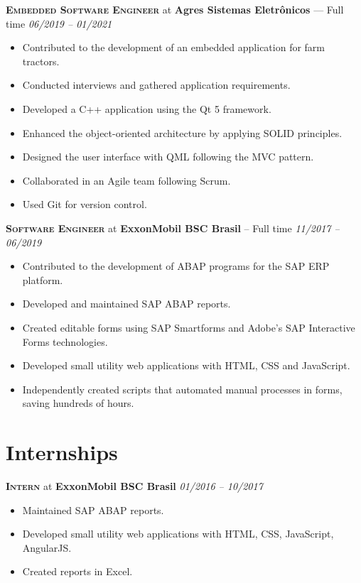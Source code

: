 \documentclass[a4paper,12pt]{article}
\begin{document}
\textbf{\textsc{Embedded Software Engineer}} at \textbf{Agres Sistemas Eletrônicos} --- Full time \hfill \textit{06/2019 -- 01/2021}

{\small
\begin{itemize}[leftmargin=*,label=\large\textbullet]
    \setlength\itemsep{-0.2em}
    \item Contributed to the development of an embedded application for farm tractors.
    \item Conducted interviews and gathered application requirements.
    \item Developed a C++ application using the Qt 5 framework.
    \item Enhanced the object-oriented architecture by applying SOLID principles.
    \item Designed the user interface with QML following the MVC pattern.
    \item Collaborated in an Agile team following Scrum.
    \item Used Git for version control.
\end{itemize}
}

\textbf{\textsc{Software Engineer}} at \textbf{ExxonMobil BSC Brasil} -- Full time \hfill \textit{11/2017 -- 06/2019}
{\small
\begin{itemize}[leftmargin=*,label=\large\textbullet]
    \setlength\itemsep{-0.2em}
    \item Contributed to the development of ABAP programs for the SAP ERP platform.
    \item Developed and maintained SAP ABAP reports.
    \item Created editable forms using SAP Smartforms and Adobe's SAP Interactive Forms technologies.
    \item Developed small utility web applications with HTML, CSS and JavaScript.
    \item Independently created scripts that automated manual processes in forms, saving hundreds of hours.
\end{itemize}
}

\section{Internships}
\vspace{8pt}

\textbf{\textsc{Intern}} at \textbf{ExxonMobil BSC Brasil} \hfill \textit{01/2016 -- 10/2017}
{\small
\begin{itemize}[leftmargin=*,label=\large\textbullet]
    \setlength\itemsep{-0.2em}
    \item Maintained SAP ABAP reports.
    \item Developed small utility web applications with HTML, CSS, JavaScript, AngularJS.
    \item Created reports in Excel.
\end{itemize}
}
\end{document}
